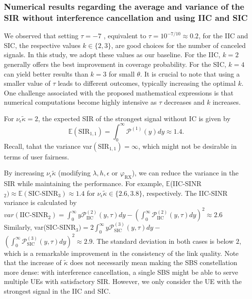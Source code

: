 \documentclass[lettersize,journal]{IEEEtran}
\begin{document}
\subsubsection{Numerical results regarding the average and variance of the SIR without interference cancellation and using IIC and SIC}


We observed that setting $\tau = -7$ , equivalent to $\tau = 10^{-7/10} \approx 0.2$, for the IIC and SIC, the respective values $k \in \{2,3\}$, are good choices for the number of canceled signals. In this study, we adopt these values as our baseline. For the IIC, $k = 2$ generally offers the best improvement in coverage probability. For the SIC, $k = 4$ can yield better results than $k = 3$ for small $\theta$. It is crucial to note that using a smaller value of $\tau$ leads to different outcomes, typically increasing the optimal $k$. One challenge associated with the proposed mathematical expressions is that numerical computations become highly intensive as $\tau$ decreases and $k$ increases.


For $\nu_{\epsilon} \tilde{\kappa}=2$, the expected SIR of the strongest signal without IC is given by
\begin{equation}
  \mathbb{E}(\text{SIR}_{1,1})= \int_{0}^{\infty}\mathcal{P}^{(1)}(y)dy \approx 1.4.
\end{equation}
  Recall, tahat the variance var$(\text{SIR}_{1,1})=\infty$, which might not be desirable in terms of user fairness.

  By increasing $\nu_{\epsilon} \tilde{\kappa}$ (modifying $\lambda,h,\epsilon$ or $\varphi_{\text{RX}}$), we can reduce the variance in the SIR while maintaining the performance. For example, $ \mathbb{E}$(IIC-SINR$_{2}) \approx \mathbb{E}(\text{SIC-SINR}_{3}) \approx 1.4$ for $\nu_{\epsilon} \tilde{\kappa}\in \{2.6,3.8\}$, respectively. The IIC-SINR variance is calculated by
  $var(\text{IIC-SINR}_{2})=\int_{0}^{\infty}y\mathcal{P}_{\text{IIC}}^{(2)}(y,\tau)dy -\left(\int_{0}^{\infty}\mathcal{P}_{\text{IIC}}^{(2)}(y,\tau)dy\right)^2  \approx 2.6$ Similarly, var(SIC-SINR$_{3}) = 2\int_{0}^{\infty}y\mathcal{P}_{\text{SIC}}^{(3)}(y,\tau)dy-$ $\left(\int_{0}^{\infty}\mathcal{P}_{\text{SIC}}^{(3)}(y,\tau)dy\right)^2 \approx 2.9$. The standard deviation in both cases is below $2$, which is a remarkable improvement in the consistency of the link quality. Note that the increase of $\tilde{\kappa}$ does not necessarily mean making the SBS constellation more dense: with interference cancellation, a single SBS might be able to serve multiple UEs with satisfactory SIR. However, we only consider the UE with the strongest signal in the IIC and SIC.
\end{document}
